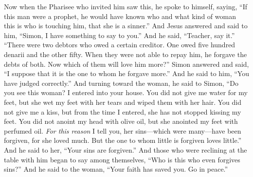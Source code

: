 \begin{biblechapter}
\verse Now when the Pharisee who invited him saw this, he spoke to himself, saying, “If this man were a prophet, he would have known who and what kind of woman this is who is touching him, that she is a sinner.”
\verse And Jesus answered and said to him, “Simon, I have something to say to you.” And he said, “Teacher, say it.”
\verse “There were two debtors who owed a certain creditor. One owed five hundred denarii and the other fifty.
\verse When they were not able to repay him, he forgave the debts of both. Now which of them will love him more?”
\verse Simon answered and said, “I suppose that it is the one to whom he forgave more.” And he said to him, “You have judged correctly.”
\verse And turning toward the woman, he said to Simon, “Do you see this woman? I entered into your house. You did not give me water for my feet, but she wet my feet with her tears and wiped them with her hair.
\verse You did not give me a kiss, but from the time I entered, she has not stopped kissing my feet.
\verse You did not anoint my head with olive oil, but she anointed my feet with perfumed oil.
\verse \textit{For this reason} I tell you, her sins—which were many—have been forgiven, for she loved much. But the one to whom little is forgiven loves little.”
\verse And he said to her, “Your sins are forgiven.”
\verse And those who were reclining at the table with him began to say among themselves, “Who is this who even forgives sins?”
\verse And he said to the woman, “Your faith has saved you. Go in peace.”
\end{biblechapter}


